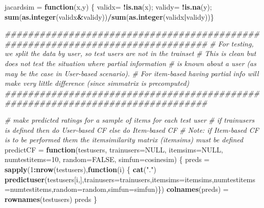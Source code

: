\documentclass[]{article}
\newenvironment{Shaded}{\begin{snugshade}}{\end{snugshade}}
\newcommand{\CommentTok}[1]{\textcolor[rgb]{0.56,0.35,0.01}{\textit{#1}}}
\newcommand{\ControlFlowTok}[1]{\textcolor[rgb]{0.13,0.29,0.53}{\textbf{#1}}}
\newcommand{\DataTypeTok}[1]{\textcolor[rgb]{0.13,0.29,0.53}{#1}}
\newcommand{\DecValTok}[1]{\textcolor[rgb]{0.00,0.00,0.81}{#1}}
\newcommand{\KeywordTok}[1]{\textcolor[rgb]{0.13,0.29,0.53}{\textbf{#1}}}
\newcommand{\NormalTok}[1]{#1}
\newcommand{\OperatorTok}[1]{\textcolor[rgb]{0.81,0.36,0.00}{\textbf{#1}}}
\newcommand{\OtherTok}[1]{\textcolor[rgb]{0.56,0.35,0.01}{#1}}
\newcommand{\StringTok}[1]{\textcolor[rgb]{0.31,0.60,0.02}{#1}}
\begin{document}
\begin{Shaded}
\begin{Highlighting}[]
\NormalTok{jacardsim =}\StringTok{ }\ControlFlowTok{function}\NormalTok{(x,y) \{ validx=}\StringTok{ }\OperatorTok{!}\KeywordTok{is.na}\NormalTok{(x); validy=}\StringTok{ }\OperatorTok{!}\KeywordTok{is.na}\NormalTok{(y); }
                            \KeywordTok{sum}\NormalTok{(}\KeywordTok{as.integer}\NormalTok{(validx}\OperatorTok{&}\NormalTok{validy))}\OperatorTok{/}\KeywordTok{sum}\NormalTok{(}\KeywordTok{as.integer}\NormalTok{(validx}\OperatorTok{|}\NormalTok{validy))\}}

\CommentTok{###############################################################################}
\CommentTok{# For testing, we split the data by user, so test users are not in the trainset}
\CommentTok{# This is clean but does not test the situation where partial information }
\CommentTok{# is known about a user (as may be the case in User-based scenario).}
\CommentTok{# For item-based having partial info will make very little difference (since simmatrix is precomputed)}
\CommentTok{###############################################################################}

\CommentTok{# make predicted ratings for a sample of items for each test user}
\CommentTok{# if trainusers is defined then do User-based CF else do Item-based CF}
\CommentTok{# Note: if Item-based CF is to be performed them the itemsimilarity matrix (itemsims) must be defined}
\NormalTok{predictCF =}\StringTok{ }\ControlFlowTok{function}\NormalTok{(testusers, }\DataTypeTok{trainusers=}\OtherTok{NULL}\NormalTok{, }\DataTypeTok{itemsims=}\OtherTok{NULL}\NormalTok{, }\DataTypeTok{numtestitems=}\DecValTok{10}\NormalTok{, }\DataTypeTok{random=}\OtherTok{FALSE}\NormalTok{, }\DataTypeTok{simfun=}\NormalTok{cosinesim) \{}
\NormalTok{  preds =}\StringTok{ }\KeywordTok{sapply}\NormalTok{(}\DecValTok{1}\OperatorTok{:}\KeywordTok{nrow}\NormalTok{(testusers),}\ControlFlowTok{function}\NormalTok{(i) \{}
    \KeywordTok{cat}\NormalTok{(}\StringTok{"."}\NormalTok{)}
    \KeywordTok{predictuser}\NormalTok{(testusers[i,],}\DataTypeTok{trainusers=}\NormalTok{trainusers,}\DataTypeTok{itemsims=}\NormalTok{itemsims,}\DataTypeTok{numtestitems=}\NormalTok{numtestitems,}\DataTypeTok{random=}\NormalTok{random,}\DataTypeTok{simfun=}\NormalTok{simfun)\})}
  \KeywordTok{colnames}\NormalTok{(preds) =}\StringTok{ }\KeywordTok{rownames}\NormalTok{(testusers)}
\NormalTok{  preds}
\NormalTok{\}}


\end{Highlighting}
\end{Shaded}
\end{document}

